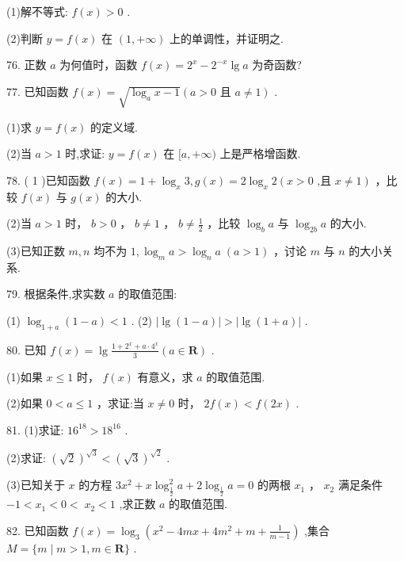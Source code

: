 \documentclass[10pt]{article}
\begin{document}
(1)解不等式: \(f\left( x\right)  > 0\) .

(2)判断 \(y = f\left( x\right)\) 在 \(\left( {1, + \infty }\right)\) 上的单调性，并证明之.

76. 正数 \(a\) 为何值时，函数 \(f\left( x\right)  = {2}^{x} - {2}^{-x}\lg a\) 为奇函数?

77. 已知函数 \(f\left( x\right)  = \sqrt{{\log }_{a}x - 1}\left( {a > 0\text{ 且 }a \neq  1}\right)\) .

(1)求 \(y = f\left( x\right)\) 的定义域.

(2)当 \(a > 1\) 时,求证: \(y = f\left( x\right)\) 在 \(\lbrack a, + \infty )\) 上是严格增函数.

78. ( 1 )已知函数 \(f\left( x\right)  = 1 + {\log }_{x}3,g\left( x\right)  = 2{\log }_{x}2\left( {x > 0\text{ ,且 }x \neq  1}\right)\) ，比较 \(f\left( x\right)\) 与 \(g\left( x\right)\) 的大小.

(2)当 \(a > 1\) 时， \(b > 0\) ， \(b \neq  1\) ， \(b \neq  \frac{1}{2}\) ，比较 \({\log }_{b}a\) 与 \({\log }_{2b}a\) 的大小.

(3)已知正数 \(m,n\) 均不为 \(1,{\log }_{m}a > {\log }_{n}a\;\left( {a > 1}\right)\) ，讨论 \(m\) 与 \(n\) 的大小关系.

79. 根据条件,求实数 \(a\) 的取值范围:

(1) \({\log }_{1 + a}\left( {1 - a}\right)  < 1\) . (2) \(\left| {\lg \left( {1 - a}\right) }\right|  > \left| {\lg \left( {1 + a}\right) }\right|\) .

80. 已知 \(f\left( x\right)  = \lg \frac{1 + {2}^{x} + a \cdot  {4}^{x}}{3}\left( {a \in  \mathbf{R}}\right)\) .

(1)如果 \(x \leq  1\) 时， \(f\left( x\right)\) 有意义，求 \(a\) 的取值范围.

(2)如果 \(0 < a \leq  1\) ，求证:当 \(x \neq  0\) 时， \({2f}\left( x\right)  < f\left( {2x}\right)\) .

81. (1)求证: \({16}^{18} > {18}^{16}\) .

(2)求证: \({\left( \sqrt{2}\right) }^{\sqrt{3}} < {\left( \sqrt{3}\right) }^{\sqrt{2}}\) .

(3)已知关于 \(x\) 的方程 \(3{x}^{2} + x{\log }_{\frac{1}{2}}^{2}a + 2{\log }_{\frac{1}{2}}a = 0\) 的两根 \({x}_{1}\) ， \({x}_{2}\) 满足条件 \(- 1 < {x}_{1} < 0 < \; {x}_{2} < 1\) ,求正数 \(a\) 的取值范围.

82. 已知函数 \(f\left( x\right)  = {\log }_{3}\left( {{x}^{2} - {4mx} + 4{m}^{2} + m + \frac{1}{m - 1}}\right)\) ,集合 \(M = \{ m \mid  m > 1,m \in  \mathbf{R}\}\) .
\end{document}
